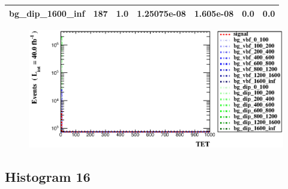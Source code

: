 \documentclass[a4paper, 10pt]{article}
\begin{document}
\begin{table}[H]
\begin{center}
\begin{tabular}{|m{23.0mm}|m{23.0mm}|m{18.0mm}|m{19.0mm}|m{19.0mm}|m{19.0mm}|m{19.0mm}|}
      \hline
      {\cellcolor{white}         bg\_dip\_1600\_inf}& {\cellcolor{white}         187}& {\cellcolor{white}         1.0}& {\cellcolor{white}         1.25075e-08}& {\cellcolor{white}         1.605e-08}& {\cellcolor{green}         0.0}& {\cellcolor{green}         0.0}\\
\hline
    \end{tabular}
  \end{center}
\end{table}

\begin{figure}[H]
  \begin{center}
    \includegraphics[scale=0.45]{selection_14.eps}\\
\caption{   }
  \end{center}
\end{figure}
      \newpage
\subsection{ Histogram 16}
\end{document}
